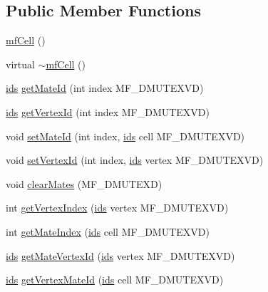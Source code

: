\subsection*{Public Member Functions}
\begin{DoxyCompactItemize}
\item 
\hyperlink{classmf_1_1mfCell_a0a3e0565d5a6a6ec7d2c722311e4ac85}{mfCell} ()
\item 
virtual \hyperlink{classmf_1_1mfCell_aaaf2e41cb6328a63c4f4515fc2bc93ef}{$\sim$mfCell} ()
\item 
\hyperlink{classmf_1_1mfBase_a3b23f16ddf59da0a91ab12cf57c1f111}{ids} \hyperlink{classmf_1_1mfCell_a2c5d5cc9f5692d2802f86750c6e9c13f}{getMateId} (int index MF\_\-DMUTEXVD)
\item 
\hyperlink{classmf_1_1mfBase_a3b23f16ddf59da0a91ab12cf57c1f111}{ids} \hyperlink{classmf_1_1mfCell_ae207eaa3e7e4aa66fc6894781b12ab49}{getVertexId} (int index MF\_\-DMUTEXVD)
\item 
void \hyperlink{classmf_1_1mfCell_a96fe10c334f74928d220d46c3761f024}{setMateId} (int index, \hyperlink{classmf_1_1mfBase_a3b23f16ddf59da0a91ab12cf57c1f111}{ids} cell MF\_\-DMUTEXVD)
\item 
void \hyperlink{classmf_1_1mfCell_a79208565b35d445d4d1873d08021e37b}{setVertexId} (int index, \hyperlink{classmf_1_1mfBase_a3b23f16ddf59da0a91ab12cf57c1f111}{ids} vertex MF\_\-DMUTEXVD)
\item 
void \hyperlink{classmf_1_1mfCell_ac74f86234370beac5f821333ad1ceb4e}{clearMates} (MF\_\-DMUTEXD)
\item 
int \hyperlink{classmf_1_1mfCell_a0d82f1103c7674516156d27d35ac9186}{getVertexIndex} (\hyperlink{classmf_1_1mfBase_a3b23f16ddf59da0a91ab12cf57c1f111}{ids} vertex MF\_\-DMUTEXVD)
\item 
int \hyperlink{classmf_1_1mfCell_ae41581511f86555eaa0ebfb5581f55ea}{getMateIndex} (\hyperlink{classmf_1_1mfBase_a3b23f16ddf59da0a91ab12cf57c1f111}{ids} cell MF\_\-DMUTEXVD)
\item 
\hyperlink{classmf_1_1mfBase_a3b23f16ddf59da0a91ab12cf57c1f111}{ids} \hyperlink{classmf_1_1mfCell_a9c977b126d6f1dc12848c303be0c36b0}{getMateVertexId} (\hyperlink{classmf_1_1mfBase_a3b23f16ddf59da0a91ab12cf57c1f111}{ids} vertex MF\_\-DMUTEXVD)
\item 
\hyperlink{classmf_1_1mfBase_a3b23f16ddf59da0a91ab12cf57c1f111}{ids} \hyperlink{classmf_1_1mfCell_a120ea26866f9a71cced4b3256cfd63df}{getVertexMateId} (\hyperlink{classmf_1_1mfBase_a3b23f16ddf59da0a91ab12cf57c1f111}{ids} cell MF\_\-DMUTEXVD)
\end{DoxyCompactItemize}
